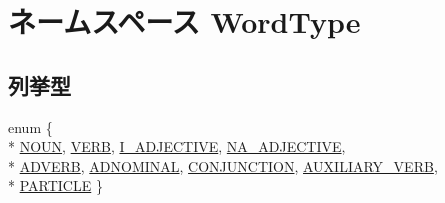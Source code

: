 \hypertarget{namespace_word_type}{\section{ネームスペース Word\-Type}
\label{namespace_word_type}
}
\subsection*{列挙型}
\begin{DoxyCompactItemize}
\item 
enum \{ \\*
\hyperlink{namespace_word_type_a8160d0189775f10e2e7fd7002c871417acb502081d50a279e3afe8f3773badb33}{N\-O\-U\-N}, 
\hyperlink{namespace_word_type_a8160d0189775f10e2e7fd7002c871417a278985710ca6eebb67202cac96f75e3e}{V\-E\-R\-B}, 
\hyperlink{namespace_word_type_a8160d0189775f10e2e7fd7002c871417a37b2792367c183d47811c1199405cf01}{I\-\_\-\-A\-D\-J\-E\-C\-T\-I\-V\-E}, 
\hyperlink{namespace_word_type_a8160d0189775f10e2e7fd7002c871417a4c58d1f7f3e5dcb3d89ddff4ecc50852}{N\-A\-\_\-\-A\-D\-J\-E\-C\-T\-I\-V\-E}, 
\\*
\hyperlink{namespace_word_type_a8160d0189775f10e2e7fd7002c871417ab12e1fac690a6bd1c060196457ec30f4}{A\-D\-V\-E\-R\-B}, 
\hyperlink{namespace_word_type_a8160d0189775f10e2e7fd7002c871417aa971db437b0f5ae391d694ba1d59de17}{A\-D\-N\-O\-M\-I\-N\-A\-L}, 
\hyperlink{namespace_word_type_a8160d0189775f10e2e7fd7002c871417a508926531b7c907b6f8020ab43eb3771}{C\-O\-N\-J\-U\-N\-C\-T\-I\-O\-N}, 
\hyperlink{namespace_word_type_a8160d0189775f10e2e7fd7002c871417ad9771c4dcee261046fdeb601b0414bbc}{A\-U\-X\-I\-L\-I\-A\-R\-Y\-\_\-\-V\-E\-R\-B}, 
\\*
\hyperlink{namespace_word_type_a8160d0189775f10e2e7fd7002c871417a90ddbcdb742dd207ddd1aad16aaf8a4c}{P\-A\-R\-T\-I\-C\-L\-E}
 \}
\end{DoxyCompactItemize}


